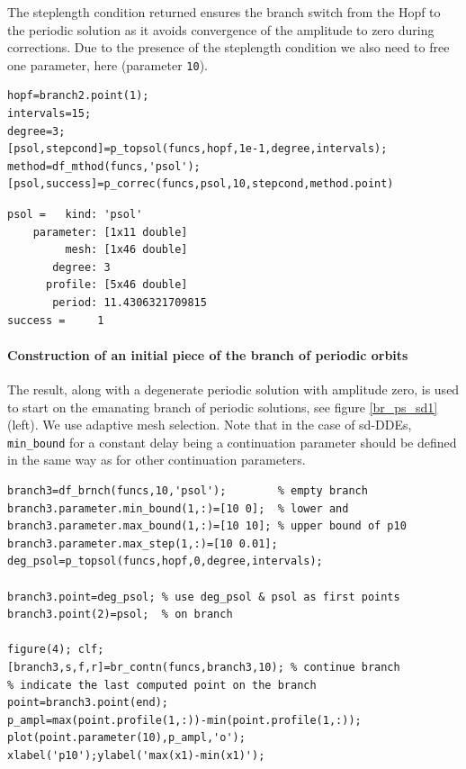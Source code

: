 \documentclass[10pt]{scrartcl}
\newcommand{\blist}[1]{\mbox{\lstinline!#1!}}
\begin{document}
The steplength condition returned ensures the branch switch from the
Hopf to the periodic solution as it avoids convergence of the
amplitude to zero during corrections. Due to the presence of the
steplength condition we also need to free one parameter, here
(parameter \texttt{10}).
\begin{lstlisting}
hopf=branch2.point(1);
intervals=15;
degree=3;
[psol,stepcond]=p_topsol(funcs,hopf,1e-1,degree,intervals);
method=df_mthod(funcs,'psol');
[psol,success]=p_correc(funcs,psol,10,stepcond,method.point)
\end{lstlisting}
{\small
\begin{verbatim}
psol =   kind: 'psol'
    parameter: [1x11 double]
         mesh: [1x46 double]
       degree: 3
      profile: [5x46 double]
       period: 11.4306321709815
success =     1
\end{verbatim}
}
\paragraph{Construction of an initial piece of the branch of periodic orbits}
The result, along with a degenerate periodic solution with amplitude
zero, is used to start on the emanating branch of periodic solutions,
see figure \ref{br_ps_sd1} (left). We use adaptive mesh selection.
Note that in the case of sd-DDEs, \blist{min_bound}
for a constant delay being a continuation parameter
should be defined in the same way as for other continuation parameters.
\begin{lstlisting}
branch3=df_brnch(funcs,10,'psol');        % empty branch
branch3.parameter.min_bound(1,:)=[10 0];  % lower and
branch3.parameter.max_bound(1,:)=[10 10]; % upper bound of p10
branch3.parameter.max_step(1,:)=[10 0.01];
deg_psol=p_topsol(funcs,hopf,0,degree,intervals);

branch3.point=deg_psol; % use deg_psol & psol as first points
branch3.point(2)=psol;  % on branch

figure(4); clf;
[branch3,s,f,r]=br_contn(funcs,branch3,10); % continue branch
% indicate the last computed point on the branch
point=branch3.point(end);
p_ampl=max(point.profile(1,:))-min(point.profile(1,:));
plot(point.parameter(10),p_ampl,'o');
xlabel('p10');ylabel('max(x1)-min(x1)');  
\end{lstlisting}
\end{document}
